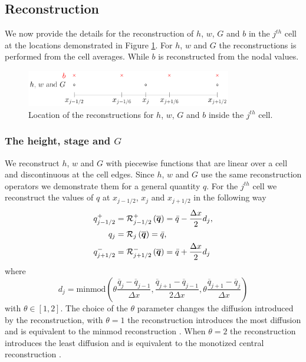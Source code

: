 \setcounter{subsection}{0}
\renewcommand{\thesubsection}{(\roman{subsection})} 
\subsection{Reconstruction}
We now provide the details for the reconstruction of $h$, $w$, $G$ and $b$ in the $j^{th}$ cell at the locations demonstrated in Figure \ref{fig:ReconLocs}. For $h$, $w$ and $G$ the reconstructions is performed from the cell averages. While $b$ is reconstructed from the nodal values.

\begin{figure}
	\centering
	\includegraphics[width=0.8\textwidth]{./chp3/figures/FEVMRecon.pdf}
	\caption{Location of the reconstructions for $h$, $w$, $G$ and $b$ inside the $j^{th}$ cell.}
	\label{fig:ReconLocs}
\end{figure}

\subsubsection{The height, stage and $G$}
We reconstruct $h$, $w$ and $G$ with piecewise functions that are linear over a cell and discontinuous at the cell edges. Since $h$, $w$ and $G$ use the same reconstruction operators we demonstrate them for a general quantity $q$. For the $j^{th}$ cell we reconstruct the values of $q$ at $x_{j-1/2} $, $x_{j} $ and $x_{j+1/2}$ in the following way
\begin{subequations}
	\begin{align}
	q^+_{j-1/2} & = \mathcal{R}^+_{j-1/2} \left(\overline{\boldsymbol{q}}\right) = \bar{q} - \dfrac{\Delta x}{2} d_j, \\
	q_{j} &= \mathcal{R}_{j} \left(\overline{\boldsymbol{q}}\right) =\bar{q} ,\\
	q^-_{j+1/2} &= \mathcal{R}^-_{j+1/2} \left(\overline{\boldsymbol{q}}\right) = \bar{q} + \dfrac{\Delta x}{2} d_j
	\end{align}
	\label{eqn:ReconforhwG}
\end{subequations}
where 
\begin{equation}
d_j = \text{minmod}\left(\theta \dfrac{\overline{q}_j -\overline{q}_{j-1} }{\Delta x}, \dfrac{\overline{q}_{j+1} -\overline{q}_{j-1} }{2\Delta x}, \theta\dfrac{\overline{q}_{j+1} -\overline{q}_{j} }{\Delta x}\right)
\label{eqn:slopehGrecon}
\end{equation}
with $\theta \in \left[1,2\right]$. The choice of the $\theta$ parameter changes the diffusion introduced by the reconstruction, with $\theta =1$ the reconstruction introduces the most diffusion and is equivalent to the minmod reconstruction \cite{Roe-1986-337}. When $\theta = 2$ the reconstruction introduces the least diffusion and is equivalent to the monotized central reconstruction \cite{VanLeer-1977-276}.

